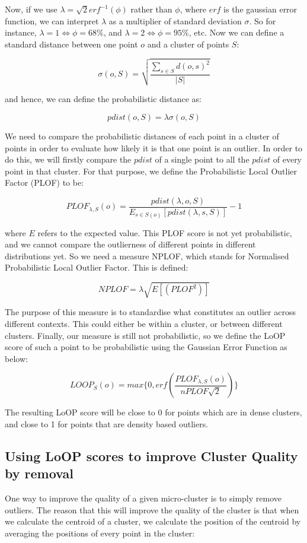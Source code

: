 \documentclass[12pt,a4paper,oneside]{report}
\begin{document}
Now, if we use  $\lambda = \sqrt{2} erf^{-1}(\phi)$ rather than $\phi$, where $erf$ is the gaussian error function, we can interpret $\lambda$ as a multiplier of standard deviation $\sigma$. So for instance,  $\lambda = 1 \Leftrightarrow \phi = 68\%$, and $\lambda = 2 \Leftrightarrow \phi = 95\%$, etc. Now we can define a standard distance between one point $o$ and a cluster of points $S$:

\[\sigma (o,S) = \sqrt{\frac{\sum_{s \in S} d(o,s)^2}{|S|}}\]   

and hence, we can define the probabilistic distance as:

\[pdist(o,S) = \lambda \sigma(o,S)\]

We need to compare the probabilistic distances of each point in a cluster of points in order to evaluate how likely it is that one point is an outlier. In order to do this, we will firstly compare the $pdist$ of a single point to all the $pdist$ of every point in that cluster. For that purpose, we define the Probabilistic Local Outlier Factor (PLOF) to be:

\[PLOF_{\lambda,S}(o) = \frac{pdist(\lambda,o,S)}{E_{s \in S(o)}[pdist(\lambda, s, S)]} - 1\]

where $E$ refers to the expected value.  This PLOF score is not yet probabilistic, and we cannot compare the outlierness of different points in different distributions yet. So we need a measure NPLOF, which stands for Normalised Probabilistic Local Outlier Factor. This is defined:

\[NPLOF = \lambda \sqrt{E[(PLOF^2)]}\]

The purpose of this measure is to standardise what constitutes an outlier across different contexts. This could either be within a cluster, or between different clusters. Finally, our measure is still not probabilistic, so we define the LoOP score of such a point to be probabilistic using the Gaussian Error Function as below:

\[LOOP_S(o) = max \{0, erf(\frac{PLOF_{\lambda,S}(o)}{nPLOF\sqrt{2}})\}\]

The resulting LoOP score will be close to 0 for points which are in dense clusters, and close to 1 for points that are density based outliers. 

\subsection*{Using LoOP scores to improve Cluster Quality by removal}

One way to improve the quality of a given micro-cluster is to simply remove outliers. The reason that this will improve the quality of the cluster is that when we calculate the centroid of a cluster, we calculate the position of the centroid by averaging the positions of every point in the cluster:
\end{document}
